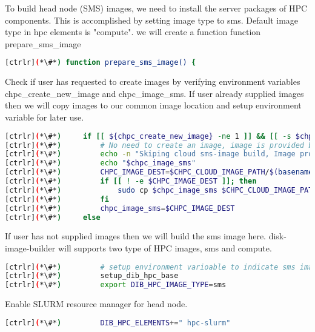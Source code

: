 	To build head node (SMS) images, we need to install the server packages of HPC components. This is accomplished by setting image type to sms. Default image type in hpc elements is "compute". we will create a function function prepare\_sms\_image

\begin{lstlisting}[language=bash,keywords={}]
[ctrlr](*\#*) function prepare_sms_image() {
\end{lstlisting} 

	Check if user has requested to create images by verifying environment variables chpc\_create\_new\_image and chpc\_image\_sms. If user already supplied images then we will copy images to our common image location and setup environment variable for later use.
	
\begin{lstlisting}[language=bash,keywords={}]
[ctrlr](*\#*)     if [[ ${chpc_create_new_image} -ne 1 ]] && [[ -s $chpc_image_sms ]]; then
[ctrlr](*\#*)         # No need to create an image, image is provided by user
[ctrlr](*\#*)         echo -n "Skiping cloud sms-image build, Image provided:"
[ctrlr](*\#*)         echo "$chpc_image_sms"
[ctrlr](*\#*)         CHPC_IMAGE_DEST=$CHPC_CLOUD_IMAGE_PATH/$(basename $chpc_image_sms)
[ctrlr](*\#*)         if [[ ! -e $CHPC_IMAGE_DEST ]]; then
[ctrlr](*\#*)             sudo cp $chpc_image_sms $CHPC_CLOUD_IMAGE_PATH
[ctrlr](*\#*)         fi
[ctrlr](*\#*)         chpc_image_sms=$CHPC_IMAGE_DEST
[ctrlr](*\#*)     else
\end{lstlisting} 

	If user has not supplied images then we will build the sms image here. disk-image-builder will supports two type of HPC images, sms and compute.  

\begin{lstlisting}[language=bash,keywords={}]
[ctrlr](*\#*)         # setup environment varioable to indicate sms image type
[ctrlr](*\#*)         setup_dib_hpc_base
[ctrlr](*\#*)         export DIB_HPC_IMAGE_TYPE=sms
\end{lstlisting} 

	Enable SLURM resource manager for head node.


\begin{lstlisting}[language=bash,keywords={}]
[ctrlr](*\#*)         DIB_HPC_ELEMENTS+=" hpc-slurm"
\end{lstlisting} 

